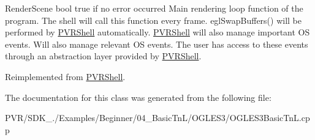   Render\+Scene  bool true if no error occurred  Main rendering loop function of the program. The shell will call this function every frame. egl\+Swap\+Buffers() will be performed by \hyperlink{class_p_v_r_shell}{P\+V\+R\+Shell} automatically. \hyperlink{class_p_v_r_shell}{P\+V\+R\+Shell} will also manage important O\+S events. Will also manage relevant O\+S events. The user has access to these events through an abstraction layer provided by \hyperlink{class_p_v_r_shell}{P\+V\+R\+Shell}. 

Reimplemented from \hyperlink{class_p_v_r_shell_ae0eb5f797cbe993a22b8659f9c332578}{P\+V\+R\+Shell}.



The documentation for this class was generated from the following file\+:\begin{DoxyCompactItemize}
\item 
P\+V\+R/\+S\+D\+K\+\_./\+Examples/\+Beginner/04\+\_\+\+Basic\+Tn\+L/\+O\+G\+L\+E\+S3/O\+G\+L\+E\+S3\+Basic\+Tn\+L.\+cpp\end{DoxyCompactItemize}
